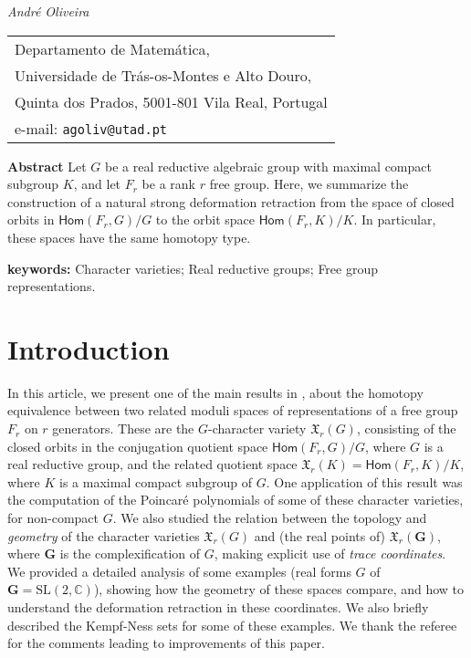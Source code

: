 \documentclass[a4paper,11pt,twoside]{article}
\newcounter{a}
\numberwithin{equation}{section}
\numberwithin{figure}{section}
\theoremstyle{plain}
\theoremstyle{definition}
\theoremstyle{remark}
\theoremstyle{plain}
\theoremstyle{plain}
\theoremstyle{plain}
\begin{document}
\begin{center}
\textit{Andr\'{e} Oliveira} \smallskip \\
\begin{tabular}{l}
\small Departamento de Matem\'{a}tica,             \\
\small  Universidade de Tr\'{a}s-os-Montes e Alto Douro,                \\
\small Quinta dos Prados, 5001-801 Vila Real, Portugal       \\
\small e-mail: \texttt{agoliv@utad.pt}
\end{tabular}
\end{center}

\noindent
\textbf{Abstract}
Let $G$ be a real reductive algebraic group with maximal compact
subgroup $K$, and let $F_{r}$ be a rank $r$ free group.
Here, we summarize the construction of a natural strong deformation retraction
from the space of closed orbits in ${\mathsf{Hom}}(F_{r},G)/G$
 to the orbit space ${\mathsf{Hom}}(F_{r},K)/K$.
In particular, these spaces have the same homotopy type.
 
\medskip

\noindent\textbf{keywords:}
Character varieties; Real reductive groups; Free group representations.

\section{Introduction}
In this article, we present one of the main results in
\cite{Casimiro-Florentino-Lawton-Oliveira:2014}, about the
homotopy equivalence between two related moduli spaces of representations
of a free group $F_r$ on $r$ generators.
These are the $G$-character variety $\mathfrak{X}_{r}(G)$, consisting of the closed
orbits in the conjugation quotient space  ${\mathsf{Hom}}(F_{r},G)/G$, where $G$ is a real reductive
group, and the related quotient space $\mathfrak{X}_{r}(K)={\mathsf{Hom}}(F_{r},K)/K$,
where $K$ is a maximal compact
subgroup of $G$.
One application of this result was the computation of the Poincar\'{e}
polynomials of some of these character varieties, for non-compact $G$.  We also studied the
relation between the topology and \emph{geometry} of
the character varieties $\mathfrak{X}_{r}(G)$ and (the real points
of) $\mathfrak{X}_{r}(\mathbf{G})$, where $\mathbf{G}$ is the complexification of $G$, making explicit use of \emph{trace
coordinates}. We provided a detailed analysis of
some examples (real forms $G$ of $\mathbf{G}={\mathrm{SL}}(2,\mathbb{C})$),
showing how the geometry of these spaces compare, and how to understand
the deformation retraction in these coordinates.
We also briefly described the Kempf-Ness sets for some of these examples.
We thank the referee for the comments leading to improvements of this paper.
\end{document}
